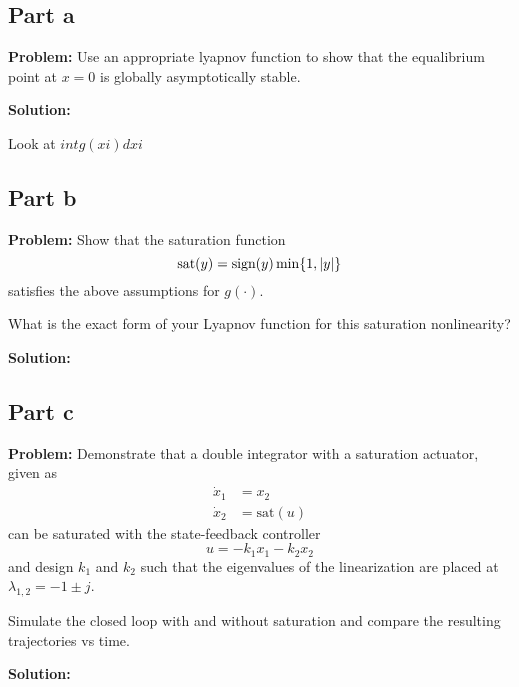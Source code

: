 \documentclass[letter]{article}
\begin{document}
\subsection{Part a}
\textbf{Problem:}
Use an appropriate lyapnov function to show that the equalibrium point at $x=0$ is globally asymptotically stable.

\noindent
\textbf{Solution:}






Look at $int g(xi) d xi$




\subsection{Part b}
\textbf{Problem:}
Show that the saturation function $$\text{sat}(y) = \text{sign}(y) \min \{1, \abs{y}\}$$ satisfies the above assumptions for $g(\cdot)$.

What is the exact form of your Lyapnov function for this saturation nonlinearity?

\noindent
\textbf{Solution:}










\newpage
\subsection{Part c}
\textbf{Problem:}
Demonstrate that a double integrator with a saturation actuator, given as
\begin{equation}
	\begin{aligned}
		\dot{x}_1 &= x_2\\
		\dot{x}_2 &= \text{sat}(u)
	\end{aligned}
\end{equation}
can be saturated with the state-feedback controller $$ u = -k_1 x_1 - k_2 x_2$$ and design $k_1$ and $k_2$ such that the eigenvalues of the linearization are placed at $\lambda_{1,2} = -1 \pm j$.

Simulate the closed loop with and without saturation and compare the resulting trajectories vs time.

\noindent
\textbf{Solution:}
\end{document}
